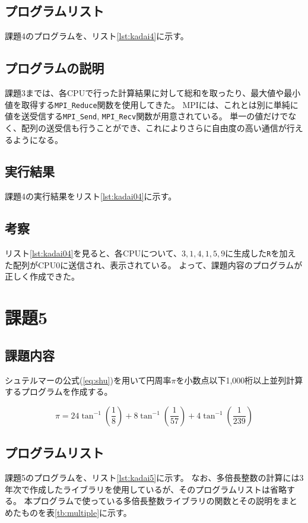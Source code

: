 \documentclass[a4j,titlepage]{jsarticle}
\begin{document}
\subsection{プログラムリスト}
課題4のプログラムを、リスト\ref{lst:kadai4}に示す。



\subsection{プログラムの説明}
課題3までは、各CPUで行った計算結果に対して総和を取ったり、最大値や最小値を取得する\texttt{MPI\_Reduce}関数を使用してきた。
MPIには、これとは別に単純に値を送受信する\texttt{MPI\_Send}, \texttt{MPI\_Recv}関数が用意されている。
単一の値だけでなく、配列の送受信も行うことができ、これによりさらに自由度の高い通信が行えるようになる。

\subsection{実行結果}
課題4の実行結果をリスト\ref{lst:kadai04}に示す。



\subsection{考察}
リスト\ref{lst:kadai04}を見ると、各CPUについて、${3, 1, 4, 1, 5, 9}$に生成した\texttt{R}を加えた配列がCPU0に送信され、表示されている。
よって、課題内容のプログラムが正しく作成できた。


\section{課題5}
\subsection{課題内容}
シュテルマーの公式(\ref{eq:shu})を用いて円周率$\pi$を小数点以下1,000桁以上並列計算するプログラムを作成する。

\begin{equation}
  \pi = 24 \tan^{-1} \left( \frac{1}{8} \right) + 8 \tan^{-1} \left( \frac{1}{57} \right) + 4 \tan^{-1} \left( \frac{1}{239} \right)
  \label{eq:shu}
\end{equation}

\subsection{プログラムリスト}
課題5のプログラムを、リスト\ref{lst:kadai5}に示す。
なお、多倍長整数の計算には3年次で作成したライブラリを使用しているが、そのプログラムリストは省略する。
本プログラムで使っている多倍長整数ライブラリの関数とその説明をまとめたものを表\ref{tb:multiple}に示す。
\end{document}
